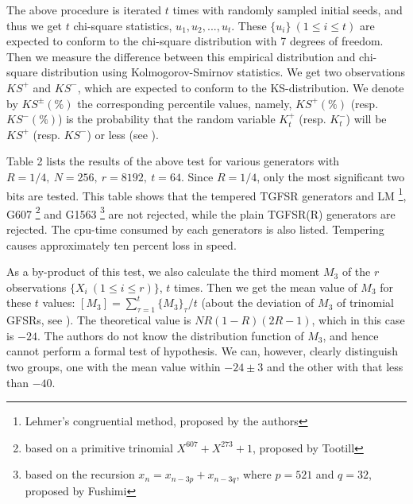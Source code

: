 The above procedure is iterated $t$ times with randomly sampled 
initial seeds, and thus we get $t$ chi-square statistics, $u_1,u_2,...,u_t$.
These $\{ u_i \}\ (1 \leq i \leq t)$ are expected to conform to the 
chi-square distribution with 7 degrees of freedom.
Then we measure the difference between this empirical 
distribution and chi-square distribution using Kolmogorov-Smirnov 
statistics. 
We get two observations
$KS^+$ and $KS^-$, which
are expected to conform to the 
KS-distribution.
We denote by $KS^{\pm}(\%)$
the corresponding percentile values,
namely,
$KS^+(\%)$ (resp. $KS^-(\%)$)
is the probability that
the random variable $K_t^+$ (resp. $K_t^-$)
will be $KS^+$ (resp. $KS^-$) or less (see \cite{knuth}).

Table 2 lists the results of the above test for 
various generators with $R=1/4,\ N=256, 
\ r=8192,\  t=64$.
Since $R=1/4$, only the most significant two bits are tested.
This table shows that the tempered TGFSR generators and LM
\footnote{Lehmer's congruential method, proposed by the authors\cite{matsumoto}
},
G607 
\footnote{based on a primitive trinomial $X^{607}+X^{273}+1$, 
proposed by Tootill\cite{tootill}
}
and G1563 
\footnote{
based on the recursion $x_n=x_{n-3p}+x_{n-3q}$, where $p=521$ and $q=32$, 
proposed by Fushimi\cite{fushimi2}
}
are not rejected, while 
the plain TGFSR(R) generators are rejected.
The cpu-time consumed by each generators is also listed. 
Tempering causes approximately ten percent loss in speed.

As a by-product of this test, we also calculate the third moment $M_3$
of the $r$ observations
$\{X_i \ (1 \leq i \leq r)\}$, $t$ times. 
Then we get the mean value of $M_3$ for these $t$ values:
$ [M_3]={\sum _ {\tau=1}^t \{M_3 \}_{\tau}}/t$
(about the deviation of $M_3$ of trinomial GFSRs, see 
\cite{lindholm}).
The theoretical value is
$NR(1-R)(2R-1)$, which in this case is $-24$. 
The authors do not know the distribution function of $M_3$,
and hence cannot perform a formal test of hypothesis.
We can, however, clearly distinguish two groups, one 
with the mean value within $-24 \pm 3$
and the other with that less than $-40$.

